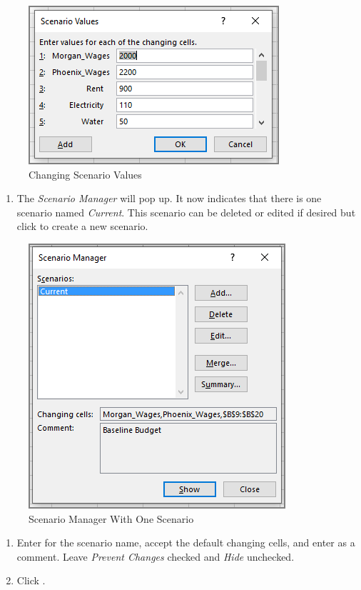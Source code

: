 \begin{figure}[H]
	\centering
	\includegraphics[width=\maxwidth{.75\linewidth}]{gfx/ch08_fig52}
	\caption{Changing Scenario Values}
	\label{08:fig52}
\end{figure}

\begin{enumerate}[resume]	
	
	\item The \textit{Scenario Manager} will pop up. It now indicates that there is one scenario named \textit{Current}. This scenario can be deleted or edited if desired but click  to create a new scenario.
	
\end{enumerate}

\begin{figure}[H]
	\centering
	\includegraphics[width=\maxwidth{.65\linewidth}]{gfx/ch08_fig53}
	\caption{Scenario Manager With One Scenario}
	\label{08:fig53}
\end{figure}

\begin{enumerate}[resume]	
	
	\item Enter  for the scenario name, accept the default changing cells, and enter  as a comment. Leave \textit{Prevent Changes} checked and \textit{Hide} unchecked.
	\item Click .
	
\end{enumerate}

